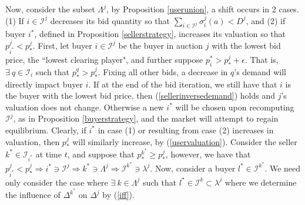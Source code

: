 \documentclass[sigconf, anonymous]{acmart}
\newcommand{\mcI}{\mathcal{I}}
\newcommand{\g}{\sigma}
\theoremstyle{definition}
\begin{document}
Now, consider the subset $\Lambda^j$, by
Proposition \ref{userunion}, a shift occurs in 2 cases. (1) If $i\in\mcI^j$
decreases its bid quantity so that $\sum_{i\in\mcI^j}
\g_i^j(a) < D^j$, and (2) if buyer $i^*$, defined in Proposition
\ref{sellerstrategy}, increases its valuation so that $p_{i^*}^j <
p_*^j$. First, let buyer $i\in\mcI^j$ be the buyer in auction $j$ with the
lowest bid price, the ``lowest clearing player",
and further suppose $p_i^* > p_*^j + \epsilon$. That is, $\exists \ q \in \mcI_i$ such
that $p_*^q > p_*^j$. Fixing all other bids, a decrease in $q$'s demand will
directly impact buyer $i$. If at the end of the bid iteration, we still have that $i$ is the
buyer with the lowest bid price, then (\ref{sellerinversedemand}) holds and $j$'s valuation does not change. Otherwise a new $i^*$ will be chosen upon
recomputing $\mcI^j$, as in Proposition \ref{buyerstrategy}, and the market
will attempt to regain equilibrium.
Clearly, if $i^*$ in case (1) or resulting from case (2) increases in valuation,
then $p_*^j$ will similarly increase, by (\ref{uservaluation}). Consider the 
seller $k^*\in\mcI_{i^*}$ at time $t$, and suppose that $p_*^{k^*} \ge p_*^j$, however, we have that $p_{i^*}^j <
p_*^j \Rightarrow i^* \ni \mcI^j \Rightarrow k^*\ni\Lambda^j\Rightarrow \mcI^{k^*} \ni
\lambda^j$. Now, consider a buyer $l^*\in\mcI^{k^*}$. We need only consider the
case where $\exists \ k \in\Lambda^j$ such that $l^*\in\mcI^k\subset \lambda^j$
where we determine the influence of $\Delta^{k^*}$ on $\Delta^j$ by (\ref{iff}). 
\end{document}
